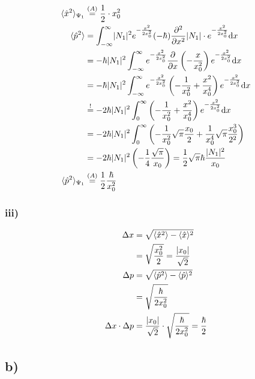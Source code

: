 \begin{align*}
        \langle \hat{x}^2 \rangle_{\Psi_1} &\stackrel{(A)}{=} \frac{1}{2} \cdot x_0^2\\
        \langle \hat{p}^2 \rangle &= \int_{-\infty}^{\infty} \lvert N_1\rvert^2 e^{- \frac{x^2}{2x_0^2}} (-\hbar) \frac{\partial ^2}{\partial x^2} 
        \lvert N_1\rvert \cdot e^{- \frac{x^2}{2x_0^2}} \mathrm{d}x\\
        &= - \hbar \lvert N_1\rvert^2 \int_{-\infty}^{\infty} e^{- \frac{x^2}{2x_0^2}} \frac{\partial}{\partial x} \left( -\frac{x}{x_0^2} 
        \right) e^{- \frac{x^2}{2x_0^2}} \mathrm{d}x \nonumber\\
        &= - \hbar \lvert N_1\rvert^2 \int_{-\infty}^{\infty} e^{- \frac{x^2}{2x_0^2}} \left( -\frac{1}{x_0^2} + \frac{x^2}{x_0^4} \right) 
        e^{- \frac{x^2}{2x_0^2}} \mathrm{d}x \nonumber\\
        &\stackrel{!}{=} -2 \hbar \lvert N_1\rvert^2 \int_{0}^{\infty} \left( -\frac{1}{x_0^2} + \frac{x^2}{x_0^4} \right) e^{- \frac{x^2}{2x_0^2}}
        \mathrm{d}x \nonumber\\
        &= -2 \hbar \lvert N_1\rvert^2 \int_{0}^{\infty} \left( -\frac{1}{x_0^2} \sqrt{\pi} \frac{x_0}{2} + \frac{1}{x_0^4} \sqrt{\pi} \frac{x_0^3}{2^2}
        \right) \nonumber\\
        &= -2 \hbar \lvert N_1\rvert^2 \left( -\frac{1}{4} \frac{\sqrt{\pi}}{x_0} \right) = \frac{1}{2} \sqrt{\pi} \hbar \frac{\lvert N_1\rvert^2}{x_0} \nonumber\\
        \langle \hat{p}^2 \rangle_{\Psi_1} &\stackrel{(A)}{=} \frac{1}{2} \frac{\hbar}{x_0^2}
    \end{align*}

\subsubsection{iii)}

    \begin{align*}
        \Delta x &= \sqrt{\langle \hat{x}^2 \rangle - \langle \hat{x} \rangle^2}\\
        &= \sqrt{\frac{x_0^2}{2}} = \frac{\lvert x_0\rvert}{\sqrt{2}}\\
        \Delta p &= \sqrt{\langle \hat{p}^2 \rangle - \langle \hat{p} \rangle^2}\\
        &= \sqrt{\frac{\hbar}{2 x_0^2}}\\
        \Delta x \cdot \Delta p &= \frac{\lvert x_0\rvert}{\sqrt{2}} \cdot \sqrt{\frac{\hbar}{2 x_0^2}}
        = \frac{\hbar}{2}
    \end{align*}

\subsection{b)}

